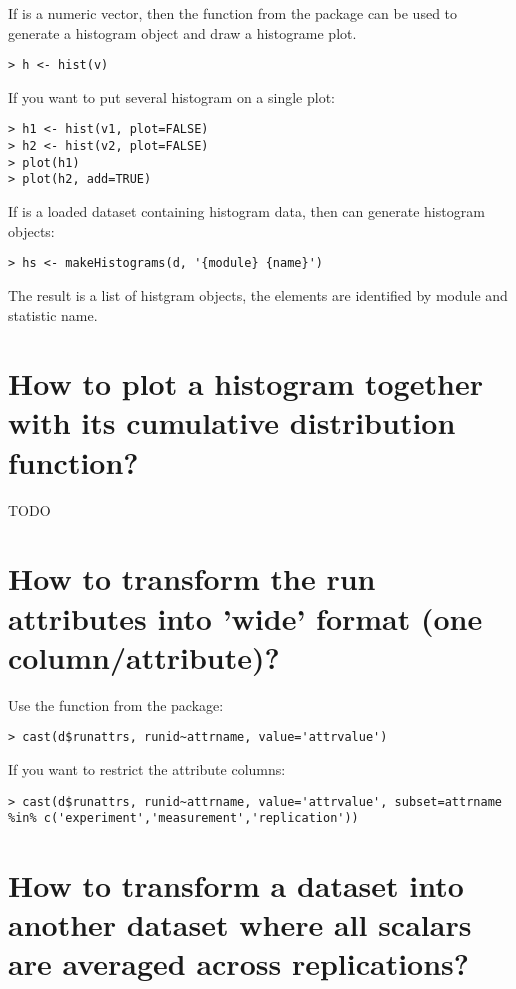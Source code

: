 If  is a numeric vector, then the  function from the  package
can be used to generate a histogram object and draw a histograme plot.

\begin{verbatim}
> h <- hist(v)
\end{verbatim}

If you want to put several histogram on a single plot:

\begin{verbatim}
> h1 <- hist(v1, plot=FALSE)
> h2 <- hist(v2, plot=FALSE)
> plot(h1)
> plot(h2, add=TRUE)
\end{verbatim}

If  is a loaded dataset containing histogram data, then  can generate
histogram objects:

\begin{verbatim}
> hs <- makeHistograms(d, '{module} {name}') 
\end{verbatim}

The result is a list of histgram objects, the elements are identified by module and statistic name.

\section{How to plot a histogram together with its cumulative distribution function?}

TODO

\section{How to transform the run attributes into 'wide' format (one column/attribute)?}

Use the  function from the  package:

\begin{verbatim}
> cast(d$runattrs, runid~attrname, value='attrvalue')
\end{verbatim}

If you want to restrict the attribute columns:

\begin{verbatim}
> cast(d$runattrs, runid~attrname, value='attrvalue', subset=attrname %in% c('experiment','measurement','replication'))
\end{verbatim}

\section{How to transform a dataset into another dataset where all scalars are averaged across replications?}

